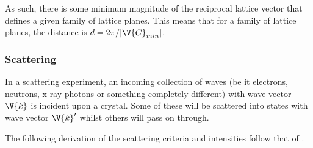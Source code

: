\documentclass[main.tex]{subfiles}
\begin{document}
	As such, there is some minimum magnitude of the reciprocal lattice vector that defines a given family of lattice planes. This means that for a family of lattice planes, the distance is $ d = 2\pi /| \V{G}_{min}| $.
	
	\subsubsection{Scattering}
	In a scattering experiment, an incoming collection of waves (be it electrons, neutrons, x-ray photons or something completely different) with wave vector $ \V{k} $ is incident upon a crystal. Some of these will be scattered into states with wave vector $ \V{k}' $ whilst others will pass on through. 
	
	The following derivation of the scattering criteria and intensities follow that of \cite{simon}.
	
\end{document}
